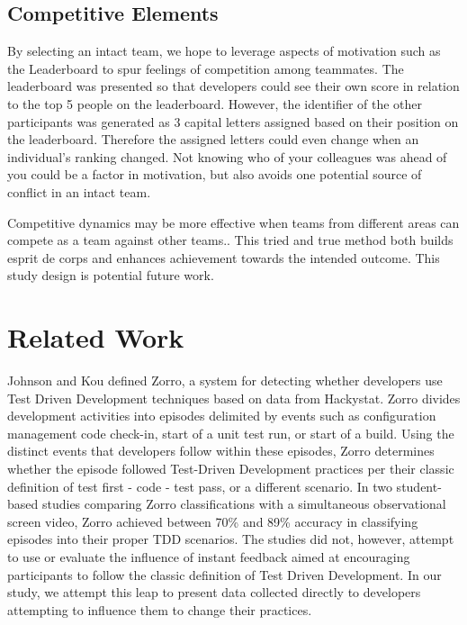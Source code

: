 \documentclass{sig-alternate}
\begin{document}
\subsection{Competitive Elements}
By selecting an intact team, we hope to leverage aspects of motivation such as the Leaderboard to spur feelings of competition among teammates.    The leaderboard was presented so that developers could see their own score in relation to the top 5 people on the leaderboard.  However, the identifier of the other participants was generated as 3 capital letters assigned based on their position on the leaderboard.  Therefore the assigned letters could even change when an individual's ranking changed.  Not knowing who of your colleagues was ahead of you could be a factor in motivation, but also avoids one potential source of conflict in an intact team.

Competitive dynamics may be more effective when teams from different areas can compete as a team against other teams..  This tried and true method both builds esprit de corps and enhances achievement towards the intended outcome.  This study design is potential future work. 

\section{Related Work}

Johnson and Kou defined Zorro\cite{V:Johnson2007Automated}, a system for detecting whether developers use Test Driven Development techniques based on data from Hackystat.  Zorro divides development activities into episodes delimited by events such as configuration management code check-in, start of a unit test run, or start of a build.  Using the distinct events that developers follow within these episodes, Zorro determines whether the episode followed Test-Driven Development practices per their classic definition of test first - code - test pass, or a different scenario.  In two student-based studies comparing Zorro classifications with a simultaneous observational screen video, Zorro achieved between 70\% \cite{Kou2010Operational} and 89\% \cite{V:Johnson2007Automated} accuracy in classifying episodes into their proper TDD scenarios.  The studies did not, however, attempt to use or evaluate the influence of instant feedback aimed at encouraging participants to follow the classic definition of Test Driven Development.  In our study, we attempt this leap to present data collected directly to developers attempting to influence them to change their practices.
\end{document}
